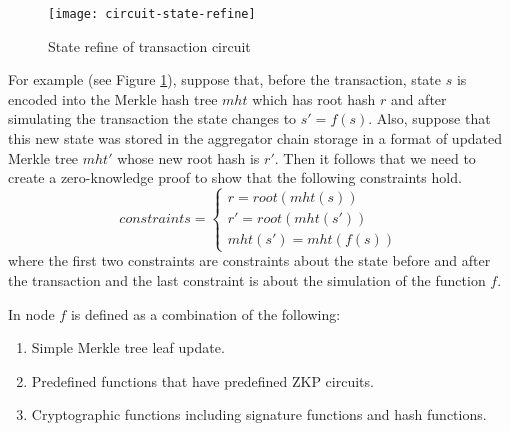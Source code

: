 \begin{figure}[!ht]
\begin{center}
\texttt{[image: circuit-state-refine]}
\end{center}
\caption{State refine of transaction circuit}
\label{circuit-refine}
\end{figure}

For example (see Figure \ref{circuit-refine}), suppose that, before the transaction, state $s$ is encoded into the Merkle hash tree $mht$ which has root hash $r$ and after simulating the transaction the state changes to $s' = f(s)$. Also, suppose that this new state was stored in the aggregator chain storage in a format of updated Merkle tree $mht'$ whose new root hash is $r'$.
Then it follows that we need to create a zero-knowledge proof to show that the following constraints hold.
\[ constraints = \begin{cases}
    r = root(mht(s)) \\
    r' = root(mht(s'))\\
    mht(s') = mht(f(s))
\end{cases} \]
where the first two constraints are constraints about the state before and after the transaction and the last constraint is about the simulation of the function $f$.


In \dprotocol node $f$ is defined as a combination of the following:

\begin{enumerate}[leftmargin=*]
\item Simple Merkle tree leaf update.
\item Predefined functions that have predefined ZKP circuits.
\item Cryptographic functions including signature functions and hash functions.
\end{enumerate}

